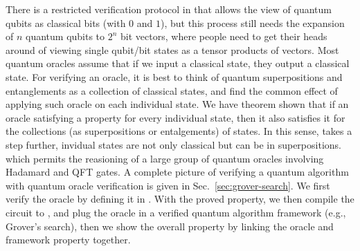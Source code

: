{There is a restricted verification protocol in \sqir that allows the view of quantum qubits as classical bits (with $0$ and $1$), but this process still needs the expansion of $n$ quantum qubits to $2^n$ bit vectors, where people need to get their heads around of viewing single qubit/bit states as a tensor products of vectors.
Most quantum oracles assume that if we input a classical state, they output a classical state.
For verifying an oracle, it is best to think of quantum superpositions and entanglements as a collection of classical states, and find the common effect of applying such oracle on each individual state. 
We have theorem shown that if an oracle satisfying a property for every individual state, then it also satisfies it for the collections (as superpositions or entalgements) of states.
In this sense, \intlang takes a step further, invidual states are not only classical but can be in superpositions. which permits the reasioning of a large group of quantum oracles involving Hadamard and QFT gates.
A complete picture of verifying a quantum algorithm with quantum oracle verification is given in Sec.~\ref{sec:grover-search}.
We first verify the oracle by defining it in \intlang. With the proved property, we then compile the circuit to \sqir, and plug the oracle in a verified quantum algorithm framework (e.g., Grover's search), then we show the overall property by linking the oracle and framework property together. 

}
